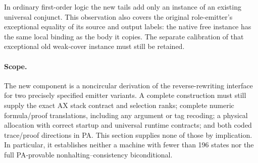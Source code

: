 In ordinary first-order logic the new tails add only an instance of an
existing universal conjunct. This observation also covers the original
role-emitter's exceptional equality of its source and output labels: the
native free instance has the same local binding as the body it copies.
The separate calibration of that exceptional old weak-cover instance
must still be retained.

\paragraph{Scope.}
The new component is a noncircular derivation of the reverse-rewriting
interface for two precisely specified emitter variants. A complete
construction must still supply the exact AX stack contract and selection
ranks; complete numeric formula/proof translations, including any
argument or tag recoding; a physical allocation with correct startup and
universal runtime contracts; and both coded trace/proof directions in
PA. This section supplies none of those by implication. In particular,
it establishes neither a machine with fewer than 196 states nor the full
PA-provable nonhalting--consistency biconditional.

\endgroup
